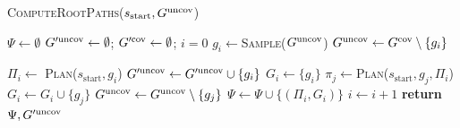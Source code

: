 \documentclass[a4paper,10pt]{article}
\begin{document}
\begin{algorithm}[t]
\caption{\textsc{ComputeRootPaths}($s_{\textrm{start}}, G^{\textrm{uncov}}$)}
\label{alg:step1}
    \AlgFontSize
\begin{algorithmic}[1]
\State $\Psi \leftarrow \emptyset$   
\State $G'^{\textrm{uncov}} \leftarrow \emptyset$; \hspace{3mm}
       $G'^{\textrm{cov}} \leftarrow \emptyset$; \hspace{3mm}
       $i = 0$
\While{$\Guncov \neq \emptyset$}
    \State $g_i \leftarrow$\textsc{Sample}($G^{\textrm{uncov}}$)
    \State $G^{\textrm{uncov}} \leftarrow G^{\textrm{cov}} \setminus \{g_i\}$
    
    \State $\Pi_i \leftarrow$ \textsc{Plan}($s_{\textrm{start}}, g_i$)
      
        \State $G'^{\textrm{uncov}} \leftarrow G'^{\textrm{uncov}} \cup \{g_i\}$
    \Else
        \State $G_i \leftarrow \{ g_i \}$
            \State $\pi_j \leftarrow$\textsc{Plan}($s_{\textrm{start}},g_j,\Pi_i$)
             
                \State $G_i \leftarrow G_i \cup \{g_j\}$
                \State $G^{\textrm{uncov}} \leftarrow G^{\textrm{uncov}} \setminus \{g_j\}$
            \EndIf
        \EndFor
        \State $\Psi \leftarrow \Psi \cup \{ (\Pi_i, G_i)\}$
        \State $i \leftarrow i + 1$
    \EndIf
\EndWhile
\State \textbf{return} $\Psi, G'^{\textrm{uncov}}$
\end{algorithmic}
\end{algorithm}
\end{document}
